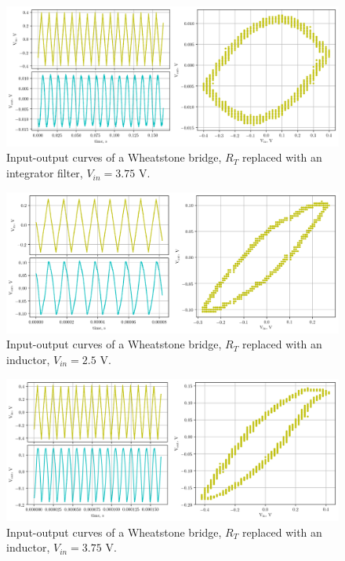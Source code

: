 \documentclass[12pt,a4paper,twoside]{article}
\begin{document}
\begin{figure}[!h]
    \centering
    \includegraphics[width = \textwidth]{c2.png}
    \caption{Input-output curves of a Wheatstone bridge, $R_T$ replaced with an integrator filter, $V_{in} = 3.75$ V.}
    \label{fig:cap-hi}
\end{figure}

\begin{figure}[!h]
    \centering
    \includegraphics[width = \textwidth]{l1.png}
    \caption{Input-output curves of a Wheatstone bridge, $R_T$ replaced with an inductor, $V_{in} = 2.5$ V.}
    \label{fig:ind-lo}
\end{figure}

\begin{figure}[!h]
    \centering
    \includegraphics[width = \textwidth]{l2.png}
    \caption{Input-output curves of a Wheatstone bridge, $R_T$ replaced with an inductor, $V_{in} = 3.75$ V.}
    \label{fig:ind-hi}
\end{figure}
\end{document}
